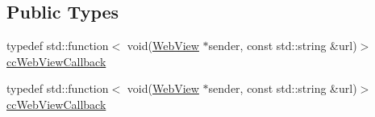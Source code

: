 \subsection*{Public Types}
\begin{DoxyCompactItemize}
\item 
typedef std\+::function$<$ void(\hyperlink{classexperimental_1_1ui_1_1WebView}{Web\+View} $\ast$sender, const std\+::string \&url)$>$ \hyperlink{classexperimental_1_1ui_1_1WebView_a11ddd376a5996eff614857f236b2b69d}{cc\+Web\+View\+Callback}
\item 
typedef std\+::function$<$ void(\hyperlink{classexperimental_1_1ui_1_1WebView}{Web\+View} $\ast$sender, const std\+::string \&url)$>$ \hyperlink{classexperimental_1_1ui_1_1WebView_a11ddd376a5996eff614857f236b2b69d}{cc\+Web\+View\+Callback}
\end{DoxyCompactItemize}
